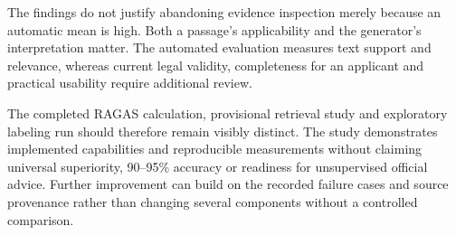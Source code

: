 The findings do not justify abandoning evidence inspection merely because an automatic mean is high. Both a passage's applicability and the generator's interpretation matter. The automated evaluation measures text support and relevance, whereas current legal validity, completeness for an applicant and practical usability require additional review.

The completed RAGAS calculation, provisional retrieval study and exploratory labeling run should therefore remain visibly distinct. The study demonstrates implemented capabilities and reproducible measurements without claiming universal superiority, 90--95\% accuracy or readiness for unsupervised official advice. Further improvement can build on the recorded failure cases and source provenance rather than changing several components without a controlled comparison.
